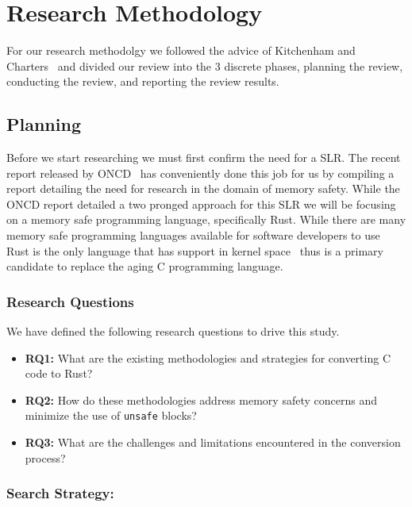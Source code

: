 \documentclass[sigconf]{acmart}
\begin{document}
\section{Research Methodology}

For our research methodolgy we followed the advice of Kitchenham and Charters~\cite{Stuart2007-cc}
and divided our review into the 3 discrete phases, planning the review, conducting the review, and
reporting the review results.

\subsection{Planning}

Before we start researching we must first confirm the need for a SLR. The recent report released by
ONCD~\cite{United_States_Gov2024-pp} has conveniently done this job for us by compiling a report
detailing the need for research in the domain of memory safety. While the ONCD report detailed a two
pronged approach for this SLR we will be focusing on a memory safe programming language,
specifically Rust. While there are many memory safe programming languages available for software
developers to use Rust is the only language that has support in kernel
space~\cite{The_kernel_development_community_undated-iw} thus is a primary candidate to replace the
aging C programming language.

\subsubsection{Research Questions}
We have defined the following research questions to drive this study.

\begin{itemize}

    \item \textbf{RQ1:} What are the existing methodologies and strategies for converting C code to
      Rust?
    \item \textbf{RQ2:} How do these methodologies address memory safety concerns and minimize the
      use of \lstinline{unsafe} blocks?
    \item \textbf{RQ3:} What are the challenges and limitations encountered in the conversion process?
\end{itemize}

\subsubsection{Search Strategy:}
\end{document}
